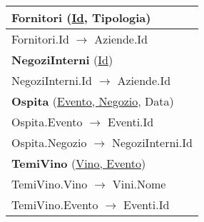 \begin{center}
\begin{minipage}[t]{7.5cm}
{\begin{tabular}{P{7.5cm}}
				 \textbf{Fornitori} (\underline{Id}, Tipologia)                                       \\
				\midrule
				Fornitori.Id $\to$ Aziende.Id                                                                                         \\                                
				\midrule

				 \textbf{NegoziInterni} (\underline{Id})                                              \\
				\midrule
				NegoziInterni.Id $\to$ Aziende.Id                                                                                     \\                                
				\midrule

				 \textbf{Ospita} (\underline{Evento, Negozio}, Data)                                  \\
				\midrule
				Ospita.Evento $\to$ Eventi.Id                                                                                         \\
				\midrule
				Ospita.Negozio $\to$ NegoziInterni.Id                                                                                 \\                                
				\midrule

				 \textbf{TemiVino} (\underline{Vino, Evento})                                         \\
				\midrule
				TemiVino.Vino $\to$ Vini.Nome                                                                                         \\
				\midrule
				TemiVino.Evento $\to$ Eventi.Id                                                                                       \\                                
				\midrule


\end{tabular}}
\end{minipage}
\end{center}
